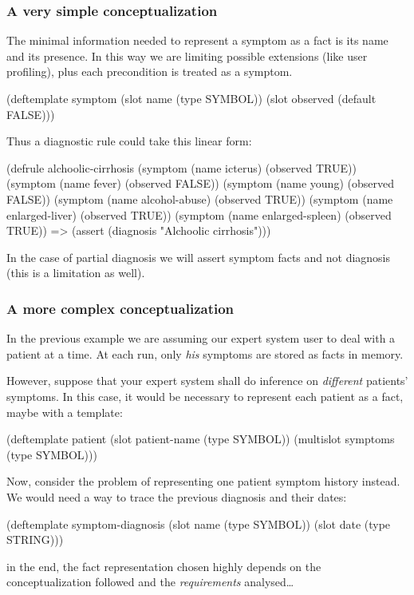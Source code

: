 \documentclass[xcolor={usenames,dvipsnames,svgnames}, compress]{beamer}
\begin{document}
\begin{frame}[fragile]
  \frametitle{A very simple conceptualization}
  The minimal information needed to represent a symptom as a fact is
  its name and its presence. In this way we are limiting possible
  extensions (like user profiling), plus each precondition is treated
  as a symptom.
  \begin{clips-code}[numbers=none]
    (deftemplate symptom
        (slot name (type SYMBOL))
        (slot observed (default FALSE)))
  \end{clips-code}

  Thus a diagnostic rule could take this linear form:
  \begin{clips-code}[numbers=none]
    (defrule alchoolic-cirrhosis
        (symptom (name icterus) (observed TRUE))
        (symptom (name fever) (observed FALSE))
        (symptom (name young) (observed FALSE))
        (symptom (name alcohol-abuse) (observed TRUE))
        (symptom (name enlarged-liver) (observed TRUE))
        (symptom (name enlarged-spleen) (observed TRUE))
        =>
        (assert (diagnosis "Alchoolic cirrhosis")))
  \end{clips-code}
  
  In the case of partial diagnosis we will assert symptom facts and
  not diagnosis (this is a limitation as well).
\end{frame}

\begin{frame}[fragile,t]
  \frametitle{A more complex conceptualization}
  In the previous example we are assuming our expert system user to
  deal with a patient at a time. At each run, only \emph{his} symptoms
  are stored as facts in memory.\par
  However, suppose that your expert system shall do inference on
  \emph{different} patients' symptoms. In this case, it would be
  necessary to represent each patient as a fact, maybe with a
  template:
  \begin{clips-code}[numbers=none]
    (deftemplate patient
        (slot patient-name (type SYMBOL))
        (multislot symptoms (type SYMBOL)))
 \end{clips-code}

 Now, consider the problem of representing one patient symptom history
 instead. We would need a way to trace the previous diagnosis and
 their dates:

 \begin{clips-code}[numbers=none]
   (deftemplate symptom-diagnosis
       (slot name (type SYMBOL))
       (slot date (type STRING)))
 \end{clips-code} 
 
 in the end, the fact representation chosen highly depends on the
 conceptualization followed and the \emph{requirements} analysed\dots
\end{frame}
\end{document}
